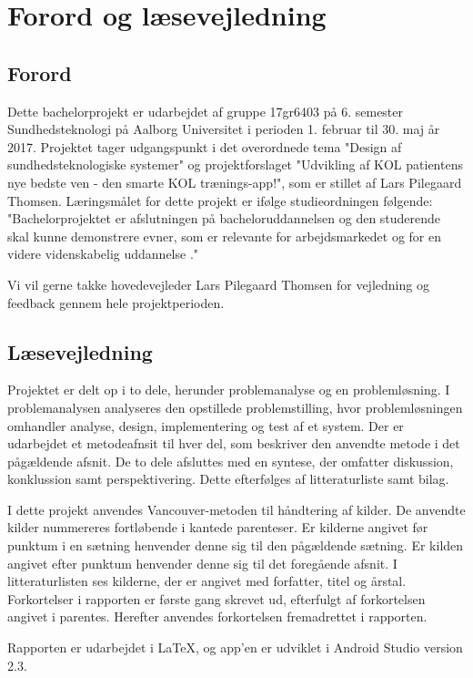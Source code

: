 \chapter*{Forord og læsevejledning}

\section*{Forord}
Dette bachelorprojekt er udarbejdet af gruppe 17gr6403 på 6. semester Sundhedsteknologi på Aalborg Universitet i perioden 1. februar til 30. maj år 2017. Projektet tager udgangspunkt i det overordnede tema "Design af sundhedsteknologiske systemer" og projektforslaget "Udvikling af KOL patientens nye bedste ven - den smarte KOL trænings-app!", som er stillet af Lars Pilegaard Thomsen. 
Læringsmålet for dette projekt er ifølge studieordningen følgende: "Bachelorprojektet er afslutningen på bacheloruddannelsen og den studerende skal kunne demonstrere evner, som er relevante for arbejdsmarkedet og for en videre videnskabelig uddannelse \cite{Studieordning2014}."

Vi vil gerne takke hovedevejleder Lars Pilegaard Thomsen for vejledning og feedback gennem hele projektperioden.

\section*{Læsevejledning}
Projektet er delt op i to dele, herunder problemanalyse og en problemløsning. I problemanalysen analyseres den opstillede problemstilling, hvor problemløsningen omhandler analyse, design, implementering og test af et system. Der er udarbejdet et metodeafnsit til hver del, som beskriver den anvendte metode i det pågældende afsnit. De to dele afsluttes med en syntese, der omfatter diskussion, konklussion samt perspektivering. Dette efterfølges af litteraturliste samt bilag. 

I dette projekt anvendes Vancouver-metoden til håndtering af kilder. De anvendte kilder nummereres fortløbende i kantede parenteser. Er kilderne angivet før punktum i en sætning henvender denne sig til den pågældende sætning. Er kilden angivet efter punktum henvender denne sig til det foregående afsnit. I litteraturlisten ses kilderne, der er angivet med forfatter, titel og årstal. Forkortelser i rapporten er første gang skrevet ud, efterfulgt af forkortelsen angivet i parentes. Herefter anvendes forkortelsen fremadrettet i rapporten.

Rapporten er udarbejdet i \LaTeX, og app'en er udviklet i Android Studio version 2.3.